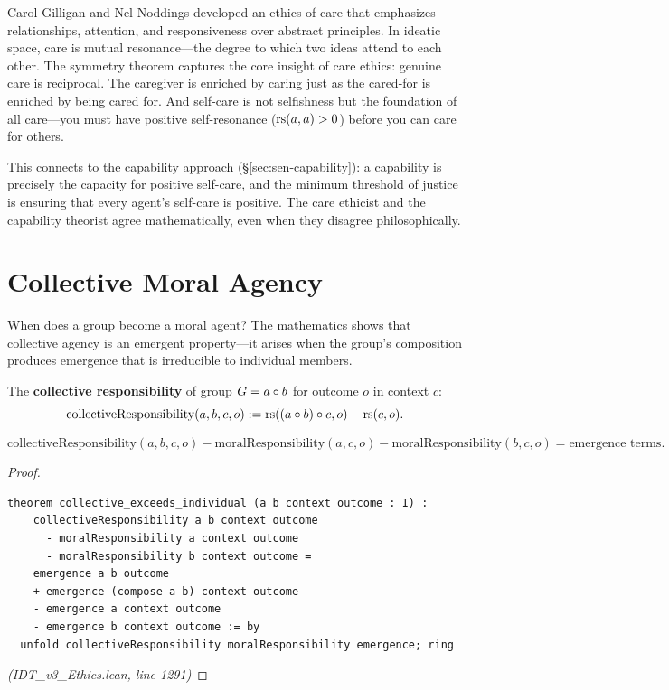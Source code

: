 \begin{interpretation}
Carol Gilligan and Nel Noddings developed an ethics of care that emphasizes
relationships, attention, and responsiveness over abstract principles. In
ideatic space, care is mutual resonance---the degree to which two ideas
attend to each other. The symmetry theorem captures the core insight of care
ethics: genuine care is reciprocal. The caregiver is enriched by caring just
as the cared-for is enriched by being cared for. And self-care is not
selfishness but the foundation of all care---you must have positive
self-resonance ($\mathrm{rs}(a,a) > 0$) before you can care for others.

This connects to the capability approach (\S\ref{sec:sen-capability}):
a capability is precisely the capacity for positive self-care, and the
minimum threshold of justice is ensuring that every agent's self-care is
positive. The care ethicist and the capability theorist agree mathematically,
even when they disagree philosophically.
\end{interpretation}

\section{Collective Moral Agency}
\label{sec:collective-agency}

When does a group become a moral agent? The mathematics shows that collective
agency is an emergent property---it arises when the group's composition
produces emergence that is irreducible to individual members.

\begin{definition}
\label{def:collective-responsibility}
The \textbf{collective responsibility} of group $G = a \circ b$ for
outcome $o$ in context $c$:
\[
  \mathrm{collectiveResponsibility}(a, b, c, o) := \mathrm{rs}((a \circ b) \circ c, o)
  - \mathrm{rs}(c, o).
\]
\end{definition}

\begin{theorem}
\label{thm:collective-exceeds}
\[
  \mathrm{collectiveResponsibility}(a, b, c, o)
  - \mathrm{moralResponsibility}(a, c, o) - \mathrm{moralResponsibility}(b, c, o)
  = \text{emergence terms}.
\]
\end{theorem}

\begin{proof}
\begin{lstlisting}
theorem collective_exceeds_individual (a b context outcome : I) :
    collectiveResponsibility a b context outcome
      - moralResponsibility a context outcome
      - moralResponsibility b context outcome =
    emergence a b outcome
    + emergence (compose a b) context outcome
    - emergence a context outcome
    - emergence b context outcome := by
  unfold collectiveResponsibility moralResponsibility emergence; ring
\end{lstlisting}
\textit{(IDT\_v3\_Ethics.lean, line 1291)}
\end{proof}

